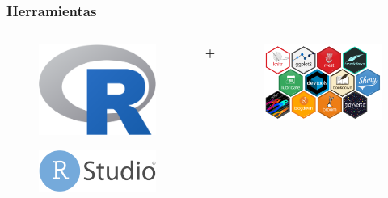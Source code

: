 \documentclass{beamer}
\begin{document}
\begin{frame}\frametitle{Herramientas}	
	\begin{columns}
		\begin{column}{0.5\textwidth}
			\begin{figure}
				\centering
				\includegraphics[width=.5\textwidth]{logos/logo_R.png}
			\end{figure}
			\begin{figure}
				\centering
				\includegraphics[width=.7\textwidth]{images/rstudio.png}
			\end{figure}
		\end{column}
		\huge{\textbf{+}}
		\begin{column}{0.5\textwidth}
			\centering
			\begin{figure}
				\centering
				\includegraphics[width=.95\textwidth]{images/R_paquetes.png}
			\end{figure}
		\end{column}
	\end{columns}
\end{frame}
\end{document}

